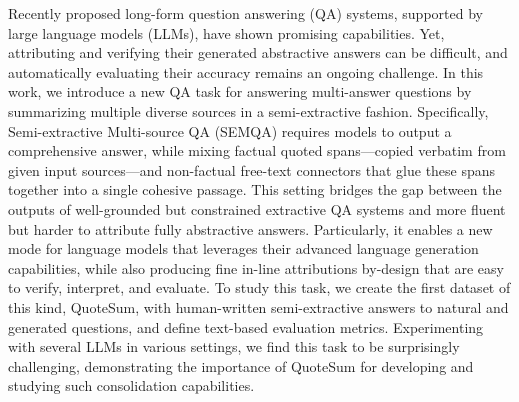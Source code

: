 Recently proposed long-form question answering (QA) systems, supported by large language models (LLMs), have shown promising capabilities. Yet, attributing and verifying their generated abstractive answers can be difficult, and automatically evaluating their accuracy remains an ongoing challenge. In this work, we introduce a new QA task for answering multi-answer questions by summarizing multiple diverse sources in a semi-extractive fashion. Specifically, Semi-extractive Multi-source QA (SEMQA) requires models to output a comprehensive answer, while mixing factual quoted spans---copied verbatim from given input sources---and non-factual free-text connectors that glue these spans together into a single cohesive passage. This setting bridges the gap between the outputs of well-grounded but constrained extractive QA systems and more fluent but harder to attribute fully abstractive answers. Particularly, it enables a new mode for language models that leverages their advanced language generation capabilities, while also producing fine in-line attributions by-design that are easy to verify, interpret, and evaluate. To study this task, we create the first dataset of this kind, QuoteSum, with human-written semi-extractive answers to natural and generated questions, and define text-based evaluation metrics. Experimenting with several LLMs in various settings, we find this task to be surprisingly challenging, demonstrating the importance of QuoteSum for developing and studying such consolidation capabilities.